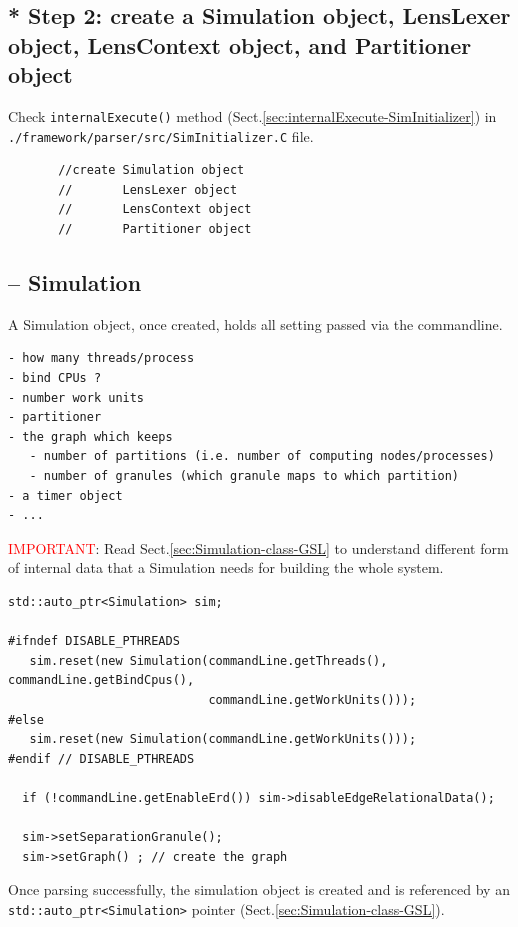 \subsection{* Step 2: create a Simulation object, LensLexer object, 
LensContext object, and Partitioner object}

Check \verb!internalExecute()! method 
(Sect.\ref{sec:internalExecute-SimInitializer}) in
\verb!./framework/parser/src/SimInitializer.C! file.
\begin{verbatim}
       //create Simulation object
       //       LensLexer object
       //       LensContext object
       //       Partitioner object
\end{verbatim}

\subsection{-- Simulation}
\label{sec:Simulation-MGS}

A Simulation object, once created, holds
all setting passed via the commandline.
\begin{verbatim}
- how many threads/process
- bind CPUs ?
- number work units
- partitioner 
- the graph which keeps
   - number of partitions (i.e. number of computing nodes/processes)
   - number of granules (which granule maps to which partition) 
- a timer object
- ...
\end{verbatim}

\textcolor{red}{IMPORTANT}: Read Sect.\ref{sec:Simulation-class-GSL} to
understand different form of internal data that a Simulation needs for building
the whole system.

{\tiny
\begin{lstlisting}
std::auto_ptr<Simulation> sim;

#ifndef DISABLE_PTHREADS
   sim.reset(new Simulation(commandLine.getThreads(), commandLine.getBindCpus(), 
                            commandLine.getWorkUnits()));
#else
   sim.reset(new Simulation(commandLine.getWorkUnits()));
#endif // DISABLE_PTHREADS

  if (!commandLine.getEnableErd()) sim->disableEdgeRelationalData();

  sim->setSeparationGranule();
  sim->setGraph() ; // create the graph
\end{lstlisting}
}

Once parsing successfully, the simulation object is created and is referenced by
an \verb!std::auto_ptr<Simulation>! pointer
(Sect.\ref{sec:Simulation-class-GSL}).

